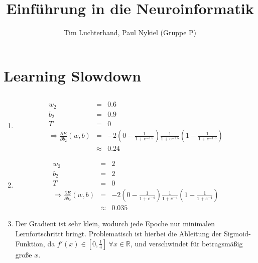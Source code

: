 \documentclass[DIN, pagenumber=false, fontsize=11pt, parskip=half]{scrartcl}
\title{Einführung in die Neuroinformatik}
\author{Tim Luchterhand, Paul Nykiel (Gruppe P)}
\begin{document}
    \maketitle
    \section{Learning Slowdown}
    \subsection{}
    \begin{enumerate}[label=(\alph*)]
        \item 
            \begin{eqnarray*}
                w_2 &=& 0.6 \\
                b_2 &=& 0.9 \\
                T &=& 0 \\
                \Rightarrow \frac{\partial E}{\partial b_2} (w,b) &=& -2 \left( 0- \frac{1}{1+e^{-1.5}} \right) \frac{1}{1+e^{-1.5}} \left( 1 -\frac{1}{1+e^{-1.5}}\right) \\
                &\approx& 0.24
            \end{eqnarray*}
        \item 
            \begin{eqnarray*}
                w_2 &=& 2 \\
                b_2 &=& 2 \\
                T &=& 0 \\
                \Rightarrow \frac{\partial E}{\partial b_2} (w,b) &=& -2 \left( 0- \frac{1}{1+e^{-4}} \right) \frac{1}{1+e^{-4}} \left( 1 -\frac{1}{1+e^{-4}}\right) \\
                &\approx& 0.035
            \end{eqnarray*}
        \item Der Gradient ist sehr klein, wodurch jede Epoche nur minimalen Lernfortschrittt bringt. Problematisch ist hierbei die Ableitung der Sigmoid-Funktion, da $f'(x) \in \left[0, \frac{1}{4}\right]\ \forall x \in \mathbb{R}$, und verschwindet für betragsmäßig große $x$.
    \end{enumerate}
\end{document}
